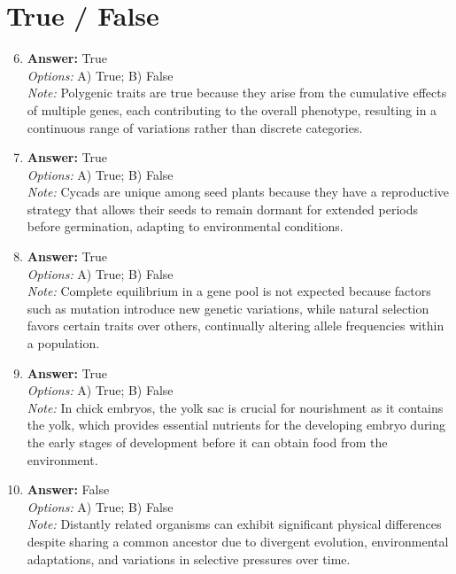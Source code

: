 \documentclass[12pt]{article}
\begin{document}
\section*{True / False}
\begin{enumerate}[label=\arabic*.]
\setcounter{enumi}{5}
\item \textbf{Answer:} True
\\ \textit{Options:} A) True; B) False
\\ \textit{Note:} Polygenic traits are true because they arise from the cumulative effects of multiple genes, each contributing to the overall phenotype, resulting in a continuous range of variations rather than discrete categories.
\item \textbf{Answer:} True
\\ \textit{Options:} A) True; B) False
\\ \textit{Note:} Cycads are unique among seed plants because they have a reproductive strategy that allows their seeds to remain dormant for extended periods before germination, adapting to environmental conditions.
\item \textbf{Answer:} True
\\ \textit{Options:} A) True; B) False
\\ \textit{Note:} Complete equilibrium in a gene pool is not expected because factors such as mutation introduce new genetic variations, while natural selection favors certain traits over others, continually altering allele frequencies within a population.
\item \textbf{Answer:} True
\\ \textit{Options:} A) True; B) False
\\ \textit{Note:} In chick embryos, the yolk sac is crucial for nourishment as it contains the yolk, which provides essential nutrients for the developing embryo during the early stages of development before it can obtain food from the environment.
\item \textbf{Answer:} False
\\ \textit{Options:} A) True; B) False
\\ \textit{Note:} Distantly related organisms can exhibit significant physical differences despite sharing a common ancestor due to divergent evolution, environmental adaptations, and variations in selective pressures over time.
\end{enumerate}
\end{document}
